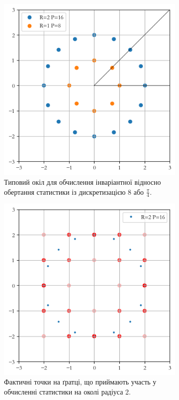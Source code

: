 \begin{figure}[h]
    \begin{subfigure}{0.48\textwidth}
    \includegraphics[width=0.9\linewidth]{img/clique-2.png} 
    \caption{
        Типовий окіл для обчислення інваріантної відносно обертання статистики із дискретизацією 8 або $\frac{\pi}{4}$. 
    }
    \label{fig:clique-2a}
    \end{subfigure}%
    \hfill
    \begin{subfigure}{0.48\textwidth}
    \includegraphics[width=0.9\linewidth]{img/clique-2-interp.png}
    \caption{
        Фактичні точки на ґратці, що приймають участь у обчисленні статистики на околі радіуса 2.
    }
    \label{fig:clique-2b}
    \end{subfigure}
    
    \caption{}
    \label{fig:clique-2}
\end{figure}


